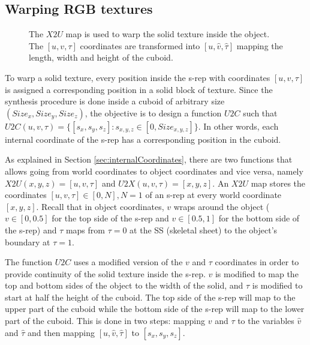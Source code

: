 \subsection{Warping RGB textures}
\label{sec:simulationExperimentRGB}

\begin{figure} 
 \centering   
 \caption[Warping a solid texture to an s-rep.]{The $X2U$ map is used to warp the solid texture inside the object. 
                                                The $[u, v, \tau]$ coordinates are transformed into $[u, \hat v, \hat \tau]$ mapping 
						 the length, width and height of the cuboid.}
 \label{fig:texturingS-reps}  
\end{figure}

To warp a solid texture, every position inside the s-rep with coordinates $[u, v, \tau]$ is assigned a corresponding position in a solid block of texture.
Since the synthesis procedure is done inside a cuboid of arbitrary size $(Size_x, Size_y, Size_z)$,
the objective is to design a function $U2C$ such that $U2C(u, v, \tau) = \{ [s_x, s_y, s_z] : s_{x, y, z} \in [0, Size_{x, y, z}] \}$.
In other words, each internal coordinate of the s-rep has a corresponding position in the cuboid.

As explained in Section \ref{sec:internalCoordinates}, there are two functions that allows going 
from world coordinates to object coordinates and vice versa, namely $X2U(x, y, z) = [u, v, \tau]$ and $U2X(u, v, \tau) = [x, y, z]$.
An $X2U$ map stores the coordinates $[u, v, \tau] \in [0, N], N = 1$  of an s-rep at every world coordinate $[x, y, z]$.
Recall that in object coordinates, $v$ wraps around the object ($v \in [0, 0.5]$ for the top side of the s-rep and 
$v \in [0.5, 1]$ for the bottom side of the s-rep) 
and $\tau$ maps from $\tau = 0$ at the SS (skeletal sheet) to the object's boundary at $\tau = 1$.

The function $U2C$ uses a modified version of the $v$ and $\tau$ coordinates
in order to provide continuity of the solid texture inside the s-rep. 
$v$ is modified to map the top and bottom sides of the object to the width of the solid,
and $\tau$ is modified to start at half the height of the cuboid.
The top side of the s-rep will map to the upper part of the cuboid
while the bottom side of the s-rep will map to the lower part of the cuboid. 
This is done in two steps: mapping $v$ and $\tau$ to the variables $\hat v$ and $\hat \tau$ 
and then mapping $[u, \hat v, \hat \tau]$ to $[s_x, s_y, s_z]$.

